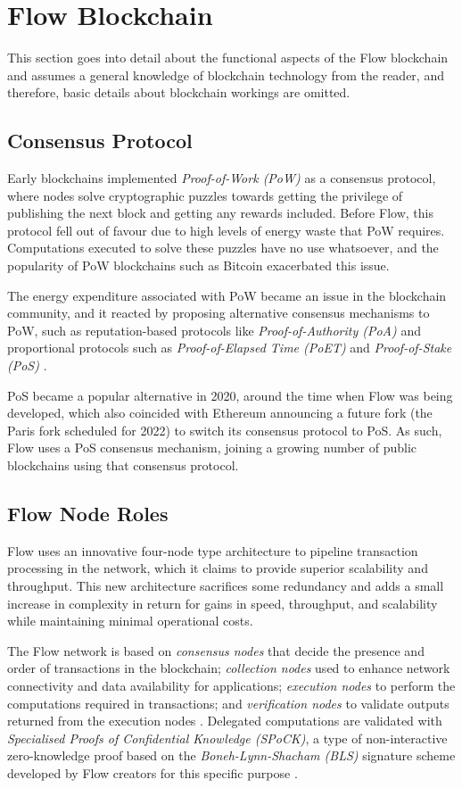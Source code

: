 \documentclass[../NFTComp_IEEE.tex]{subfiles}
\begin{document}
\section{Flow Blockchain}
\label{sec:flow_blockchain}
This section goes into detail about the functional aspects of the Flow blockchain and assumes a general knowledge of blockchain technology from the reader, and therefore, basic details about blockchain workings are omitted.

\subsection{Consensus Protocol}
Early blockchains implemented \textit{Proof-of-Work (PoW)} as a consensus protocol, where nodes solve cryptographic puzzles towards getting the privilege of publishing the next block and getting any rewards included. Before Flow, this protocol fell out of favour due to high levels of energy waste that PoW requires. Computations executed to solve these puzzles have no use whatsoever, and the popularity of PoW blockchains such as Bitcoin exacerbated this issue.
\par
The energy expenditure associated with PoW became an issue in the blockchain community, and it reacted by proposing alternative consensus mechanisms to PoW, such as reputation-based protocols like \textit{Proof-of-Authority (PoA)} and proportional protocols such as \textit{Proof-of-Elapsed Time (PoET)} and \textit{Proof-of-Stake (PoS)} \cite{Bouraga2021}.
\par
PoS became a popular alternative in 2020, around the time when Flow was being developed, which also coincided with Ethereum announcing a future fork (the Paris fork scheduled for 2022) to switch its consensus protocol to PoS. As such, Flow uses a PoS consensus mechanism, joining a growing number of public blockchains using that consensus protocol.

\subsection{Flow Node Roles}
Flow uses an innovative four-node type architecture to pipeline transaction processing in the network, which it claims to provide superior scalability and throughput. This new architecture sacrifices some redundancy and adds a small increase in complexity in return for gains in speed, throughput, and scalability while maintaining minimal operational costs.
\par
The Flow network is based on \textit{consensus nodes} that decide the presence and order of transactions in the blockchain; \textit{collection nodes} used to enhance network connectivity and data availability for applications; \textit{execution nodes} to perform the computations required in transactions; and \textit{verification nodes} to validate outputs returned from the execution nodes \cite{Hentschel2019b}. Delegated computations are validated with \textit{Specialised Proofs of Confidential Knowledge (SPoCK)}, a type of non-interactive zero-knowledge proof based on the \textit{Boneh-Lynn-Shacham (BLS)} signature scheme developed by Flow creators for this specific purpose \cite{Ben2020}.
\end{document}

